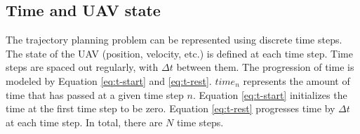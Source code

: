 \subsection{Time and UAV state}
\label{section:modeling}

The trajectory planning problem can be represented using discrete time steps. The state of the UAV (position, velocity, etc.) is defined at each time step. Time steps are spaced out regularly, with $\Delta t$ between them. The progression of time is modeled by Equation \ref{eq:t-start} and \ref{eq:t-rest}. $time_n$ represents the amount of time that has passed at a given time step $n$. Equation \ref{eq:t-start} initializes the time at the first time step to be zero. Equation \ref{eq:t-rest} progresses time by $\Delta t$ at each time step. In total, there are $N$ time steps.

